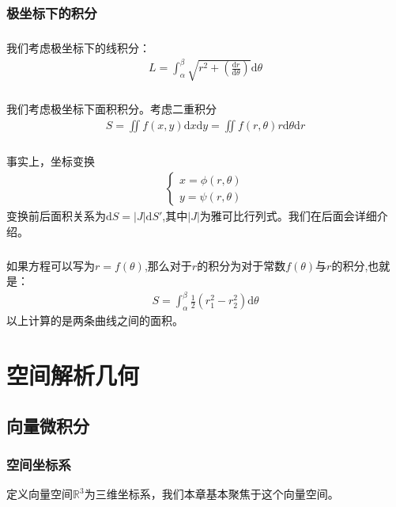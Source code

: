 \documentclass[12pt,a4paper,UTF8]{ctexbook}
\theoremstyle{plain}
\begin{document}
\subsection{极坐标下的积分}
\paragraph{}我们考虑极坐标下的线积分：
\begin{align*}
    L=\int_\alpha^\beta \sqrt{r^2+(\frac{\mathrm d r}{\mathrm d \theta})}\mathrm d \theta
\end{align*}
\paragraph{}我们考虑极坐标下面积积分。考虑二重积分
\begin{align*}
    S=\iint f(x,y)\mathrm d x\mathrm d y=\iint f(r,\theta)r\mathrm d \theta \mathrm d r
\end{align*}
\paragraph{}事实上，坐标变换
\begin{align*}
    \left\{\begin{array}{lc}x=\phi(r,\theta)\\y=\psi(r,\theta)\end{array}\right.
\end{align*}
变换前后面积关系为$\mathrm d S=|J|\mathrm d S'$,其中$|J|$为雅可比行列式。我们在后面会详细介绍。
\paragraph{}如果方程可以写为$r=f(\theta)$,那么对于$r$的积分为对于常数$f(\theta)$与$r$的积分,也就是：
\begin{align*}
    S=\int_\alpha^\beta \frac{1}{2}(r_1^2-r_2^2)\mathrm d \theta
\end{align*}
以上计算的是两条曲线之间的面积。
\chapter{空间解析几何}
\section{向量微积分}
\subsection{空间坐标系}
定义向量空间$\mathbb{R}^3$为三维坐标系，我们本章基本聚焦于这个向量空间。
\end{document}
